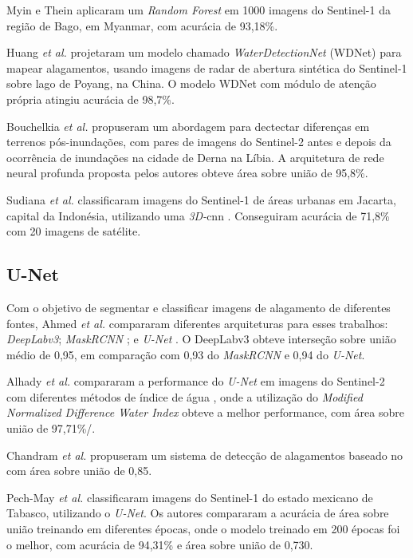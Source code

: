 Myin e Thein \cite{myin2024} aplicaram um \textit{Random Forest} em 1000 imagens do Sentinel-1 da região de Bago, em Myanmar, com acurácia de 93,18\%. 

Huang \textit{et al.} \cite{huang2024} projetaram um modelo chamado \textit{WaterDetectionNet} (WDNet) para mapear alagamentos, 
usando imagens de radar de abertura sintética \cite{sar} do Sentinel-1 sobre lago de Poyang, na China. O modelo WDNet com módulo de atenção própria atingiu acurácia de 98,7\%.

Bouchelkia \textit{et al.} \cite{bouchelkia2024} propuseram um abordagem para dectectar diferenças em terrenos pós-inundações, 
com pares de imagens do Sentinel-2 antes e depois da ocorrência de inundações na cidade de Derna na Líbia. 
A arquitetura de rede neural profunda \cite{dnn} proposta pelos autores obteve área sobre união de 95,8\%.

Sudiana \textit{et al.} \cite{sudiana2025} classificaram imagens do Sentinel-1 de áreas urbanas em Jacarta, capital da Indonésia, utilizando uma \textit{3D-}\acrshort{cnn} \cite{3dcnn}.
Conseguiram acurácia de 71,8\% com 20 imagens de satélite.

\subsection{U-Net}
Com o objetivo de segmentar e classificar imagens de alagamento de diferentes fontes, Ahmed \textit{et al.} \cite{ahmed2024} compararam diferentes arquiteturas para esses trabalhos: 
\textit{DeepLabv3}\cite{chen2017deeplabsemanticimagesegmentation}; \textit{MaskRCNN} \cite{maskrcnn}; e \textit{U-Net} \cite{unet}.
O DeepLabv3 obteve interseção sobre união \cite{iou2019} médio de 0,95, em comparação com 0,93 do \textit{MaskRCNN} e 0,94 do \textit{U-Net}.

Alhady \textit{et al.} \cite{alhady2024} compararam a performance do \textit{U-Net} em imagens do Sentinel-2 com diferentes métodos de índice de água \cite{waterindex}, onde a utilização do
\textit{Modified Normalized Difference Water Index} \cite{mndwi} obteve a melhor performance, com área sobre união de 97,71\%/.

Chandram \textit{et al.} \cite{chandran2024} propuseram um sistema de detecção de alagamentos baseado no  com área sobre união de 0,85.

Pech-May \textit{et al.} \cite{pech-may2024} classificaram imagens do Sentinel-1 do estado mexicano de Tabasco, utilizando o \textit{U-Net}. Os autores compararam a acurácia de área sobre união
treinando em diferentes épocas, onde o modelo treinado em 200 épocas foi o melhor, com acurácia de 94,31\% e área sobre união de 0,730.
